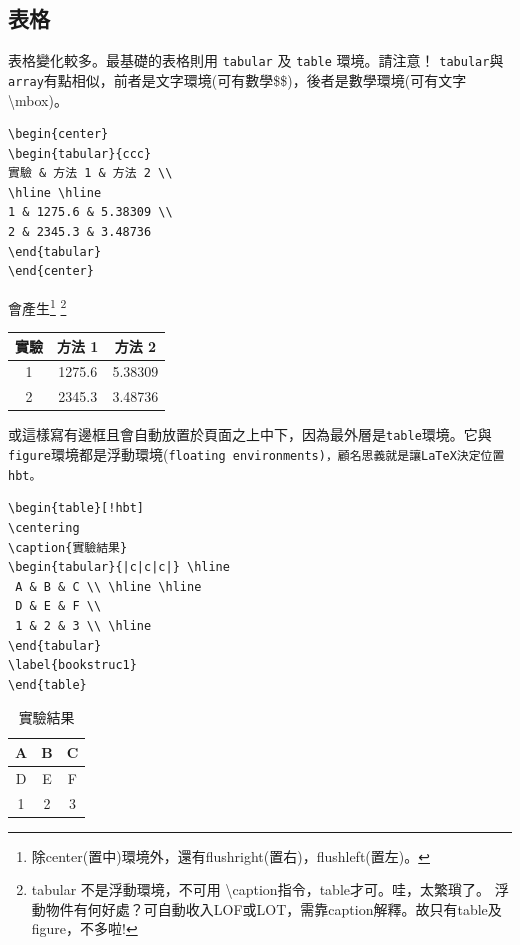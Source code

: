 \subsection{表格}
表格變化較多。最基礎的表格則用 {\tt tabular} 及 {\tt table} 環境。請注意！
{\tt tabular}與{\tt array}有點相似，前者是文字環境(可有數學\$\$)，後者是數學環境(可有文字\textbackslash mbox)。
\begin{Verbatim}[frame=single,firstline=1,label=Tabular 1]
\begin{center}
\begin{tabular}{ccc}
實驗 & 方法 1 & 方法 2 \\  
\hline \hline
1 & 1275.6 & 5.38309 \\ 
2 & 2345.3 & 3.48736
\end{tabular}
\end{center}
\end{Verbatim}
會產生\footnote{除center(置中)環境外，還有flushright(置右)，flushleft(置左)。}  \footnote{tabular 不是浮動環境，不可用{ \textbackslash caption}指令，table才可。哇，太繁瑣了。
浮動物件有何好處？可自動收入LOF或LOT，需靠caption解釋。故只有table及figure，不多啦!}
\begin{center}
\begin{tabular}{ccc}
實驗 & 方法 1 & 方法 2 \\  \hline \hline 
1 & 1275.6 & 5.38309  \\ 
2 & 2345.3 & 3.48736
\end{tabular}
\end{center}  
%
或這樣寫有邊框且會自動放置於頁面之上中下，因為最外層是{\tt table}環境。它與{\tt figure}環境都是浮動環境(\tt floating environments)，顧名思義就是讓\LaTeX{}決定位置{\tt hbt}。
\begin{Verbatim}[frame=single,firstline=1,label=Tabular 2]
\begin{table}[!hbt]
\centering
\caption{實驗結果} 
\begin{tabular}{|c|c|c|} \hline 
 A & B & C \\ \hline \hline
 D & E & F \\
 1 & 2 & 3 \\ \hline
\end{tabular}
\label{bookstruc1}
\end{table}
\end{Verbatim}
\begin{table}[!hbt]
\centering  
\caption{實驗結果} 
\begin{tabular}{|c|c|c|} \hline        
A & B & C \\ \hline \hline
D & E & F \\
1 & 2 & 3 \\ \hline 
\end{tabular}
\end{table} 

